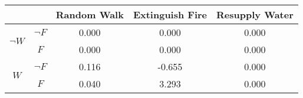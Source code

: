 \begin{center}
\begin{tabular}{|c|c|c|c|c|}
  \hline
  &   & Random Walk & Extinguish Fire & Resupply Water\\
  \hline
  \multirow{2}{*}{$\neg W$} & $\neg F$ & 0.000 & 0.000 & 0.000\\
  \cline{2-5}
   & $F$ & 0.000 & 0.000 & 0.000\\
  \hline
  \multirow{2}{*}{$W$} & $\neg F$ & 0.116 & -0.655 & 0.000\\
  \cline{2-5}
   & $F$ & 0.040 & 3.293 & 0.000\\
  \hline
\end{tabular}
\end{center}
